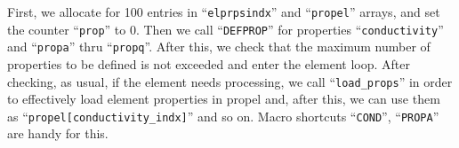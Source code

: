 First, we allocate for 100 entries in ``\verb+elprpsindx+'' and
``\verb+propel+''  arrays, and set the counter ``\verb+prop+'' to
0. Then we call ``\verb+DEFPROP+'' for properties
``\verb+conductivity+'' and ``\verb+propa+'' thru
``\verb+propq+''. After this, we check that the maximum number of
properties to be defined is not exceeded and enter the element
loop. After checking, as usual, if the element needs processing, we
call ``\verb+load_props+'' in order to effectively load element
properties in propel and, after this, we can use them as
``\verb+propel[conductivity_indx]+'' and so on. Macro shortcuts
``\verb+COND+'', ``\verb+PROPA+'' are handy for this. 


